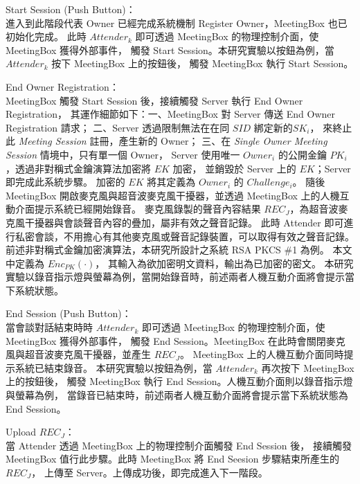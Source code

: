 \begin{steps}
    \item Start Session (Push Button)：\\
        進入到此階段代表 Owner 已經完成系統機制 Register Owner，MeetingBox 也已初始化完成。
        此時 $Attender_{k}$ 即可透過 MeetingBox 的物理控制介面，使 MeetingBox 獲得外部事件，
        觸發 Start Session。本研究實驗以按鈕為例，當 $Attender_{k}$ 按下 MeetingBox 上的按鈕後，
        觸發 MeetingBox 執行 Start Session。

    \item End Owner Registration：\\
        MeetingBox 觸發 Start Session 後，接續觸發 Server 執行 End Owner Registration，
        其運作細節如下：一、MeetingBox 對 Server 傳送 End Owner Registration 請求；
        二、Server 透過限制無法在在同 $SID$ 綁定新的$SK_{i}$，
        來終止此 {\it Meeting Session} 註冊，產生新的 Owner；
        三、在 {\it Single Owner Meeting Session} 情境中，只有單一個 Owner，
        Server 使用唯一 $Owner_{i}$ 的公開金鑰 $PK_{i}$，透過非對稱式金鑰演算法加密將 $EK$ 加密，
        並銷毀於 Server 上的 $EK$；Server 即完成此系統步驟。
        加密的 $EK$ 將其定義為 $Owner_{i}$ 的 $Challenge_{i}$。
        隨後 MeetingBox 開啟麥克風與超音波麥克風干擾器，並透過 MeetingBox 上的人機互動介面提示系統已經開始錄音。
        麥克風錄製的聲音內容結果 $REC_{J}$，為超音波麥克風干擾器與會談聲音內容的疊加，屬非有效之聲音記錄。
        此時 Attender 即可進行私密會談，不用擔心有其他麥克風或聲音記錄裝置，可以取得有效之聲音記錄。
        前述非對稱式金鑰加密演算法，本研究所設計之系統 RSA PKCS \#1 為例。 本文中定義為 $Enc_{PK}(·)$，
        其輸入為欲加密明文資料，輸出為已加密的密文。
        本研究實驗以錄音指示燈與螢幕為例，當開始錄音時，前述兩者人機互動介面將會提示當下系統狀態。

    \item End Session (Push Button)：\\
        當會談對話結束時時 $Attender_{k}$ 即可透過 MeetingBox 的物理控制介面，使 MeetingBox 獲得外部事件，
        觸發 End Session。MeetingBox 在此時會關閉麥克風與超音波麥克風干擾器，並產生 $REC_{J}$。
        MeetingBox 上的人機互動介面同時提示系統已結束錄音。
        本研究實驗以按鈕為例，當 $Attender_{k}$ 再次按下 MeetingBox 上的按鈕後，
        觸發 MeetingBox 執行 End Session。人機互動介面則以錄音指示燈與螢幕為例，
        當錄音已結束時，前述兩者人機互動介面將會提示當下系統狀態為 End Session。

    \item Upload $REC_{J}$：\\
        當 Attender 透過 MeetingBox 上的物理控制介面觸發 End Session 後，
        接續觸發 MeetingBox 值行此步驟。此時 MeetingBox 將 End Seesion 步驟結束所產生的 $REC_{J}$，
        上傳至 Server。上傳成功後，即完成進入下一階段。
\end{steps}


